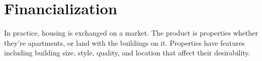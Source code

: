 
\section{Financialization} 

In practice, housing is exchanged on a market. The product is properties %
whether they're apartments, or land with the buildings on it. Properties have features including building size, style, quality, and location %
that affect their desirability. %


